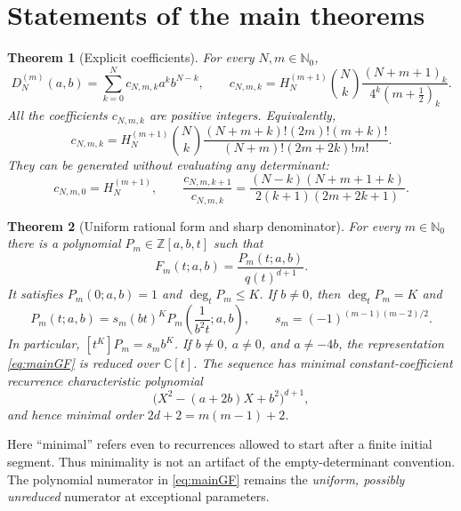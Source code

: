 \documentclass[11pt,a4paper]{article}
\numberwithin{equation}{section}
\newtheorem{theorem}{Theorem}[section]
\theoremstyle{definition}
\theoremstyle{remark}
\newcommand{\NN}{\mathbb N_0}
\newcommand{\CC}{\mathbb C}
\newcommand{\ZZ}{\mathbb Z}
\newcommand{\D}[2]{D_{#1}^{(#2)}}
\newcommand{\HH}[2]{H_{#1}^{(#2)}}
\begin{document}
\section{Statements of the main theorems}\label{sec:main}

\begin{theorem}[Explicit coefficients]\label{thm:coeff}
For every $N,m\in\NN$,
\begin{equation}\label{eq:coeff}
 \D{N}{m}(a,b)=\sum_{k=0}^N c_{N,m,k}a^k b^{N-k},\qquad
 c_{N,m,k}=\HH{N}{m+1}\binom Nk
       \frac{(N+m+1)_k}{4^k(m+\tfrac12)_k}.
\end{equation}
All the coefficients $c_{N,m,k}$ are positive integers.  Equivalently,
\begin{equation}\label{eq:coeff-factorial}
 c_{N,m,k}=\HH{N}{m+1}\binom Nk
 \frac{(N+m+k)!(2m)!(m+k)!}
 {(N+m)!(2m+2k)!m!}.
\end{equation}
They can be generated without evaluating any determinant:
\begin{equation}\label{eq:coeff-update}
 c_{N,m,0}=\HH{N}{m+1},\qquad
 \frac{c_{N,m,k+1}}{c_{N,m,k}}=
 \frac{(N-k)(N+m+1+k)}{2(k+1)(2m+2k+1)}.
\end{equation}
\end{theorem}

\begin{theorem}[Uniform rational form and sharp denominator]\label{thm:main}
For every $m\in\NN$ there is a polynomial $P_m\in\ZZ[a,b,t]$ such that
\begin{equation}\label{eq:mainGF}
 F_m(t;a,b)=\frac{P_m(t;a,b)}{q(t)^{d+1}}.
\end{equation}
It satisfies $P_m(0;a,b)=1$ and $\deg_t P_m\leq K$.
If $b\ne0$, then $\deg_t P_m=K$ and
\begin{equation}\label{eq:reciprocity}
 P_m(t;a,b)=s_m(bt)^K P_m\!\left(\frac{1}{b^2t};a,b\right),
 \qquad s_m=(-1)^{(m-1)(m-2)/2}.
\end{equation}
In particular, $[t^K]P_m=s_m b^K$.
If $b\ne0$, $a\ne0$, and $a\ne-4b$, the representation
\eqref{eq:mainGF} is reduced over $\CC[t]$.  The sequence has minimal
constant-coefficient recurrence characteristic polynomial
\begin{equation}\label{eq:charpoly}
 \bigl(X^2-(a+2b)X+b^2\bigr)^{d+1},
\end{equation}
and hence minimal order $2d+2=m(m-1)+2$.
\end{theorem}

Here ``minimal'' refers even to recurrences allowed to start after a
finite initial segment.  Thus minimality is not an artifact of the
empty-determinant convention.  The polynomial numerator in
\eqref{eq:mainGF} remains the \emph{uniform, possibly unreduced} numerator
at exceptional parameters.
\end{document}
